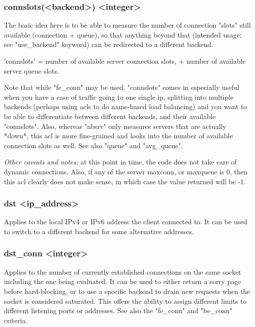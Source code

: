 \subsubsection*{connslots(<backend>) <integer>}
  The basic idea here is to be able to measure the number of connection "slots"
  still available (connection + queue), so that anything beyond that (intended
  usage; see "use\_backend" keyword) can be redirected to a different backend.

  'connslots' = number of available server connection slots, + number of
  available server queue slots.

  Note that while "fe\_conn" may be used, "connslots" comes in especially
  useful when you have a case of traffic going to one single ip, splitting into
  multiple backends (perhaps using acls to do name-based load balancing) and
  you want to be able to differentiate between different backends, and their
  available "connslots".  Also, whereas "nbsrv" only measures servers that are
  actually *down*, this acl is more fine-grained and looks into the number of
  available connection slots as well. See also "queue" and "avg\_queue".

  \emph{Other caveats and notes:} at this point in time, the code does not take care
  of dynamic connections. Also, if any of the server maxconn, or maxqueue is 0,
  then this acl clearly does not make sense, in which case the value returned
  will be -1.

\subsubsection[dst]{dst <ip\_address>}
  Applies to the local IPv4 or IPv6 address the client connected to. It can be
  used to switch to a different backend for some alternative addresses.

\subsubsection[dst\_conn]{dst\_conn <integer>}
  Applies to the number of currently established connections on the same socket
  including the one being evaluated. It can be used to either return a sorry
  page before hard-blocking, or to use a specific backend to drain new requests
  when the socket is considered saturated. This offers the ability to assign
  different limits to different listening ports or addresses. See also the
  "fe\_conn" and "be\_conn" criteria.

